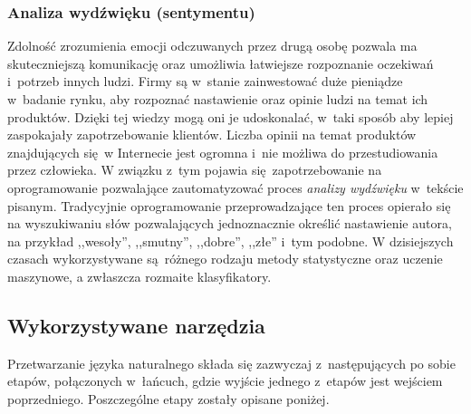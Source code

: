 \documentclass[a4paper, twoside, openright, 12pt]{report}
\begin{document}
            \subsubsection{Analiza wydźwięku (sentymentu)}
                Zdolność zrozumienia emocji odczuwanych przez drugą osobę pozwala ma skuteczniejszą komunikację oraz
                umożliwia łatwiejsze rozpoznanie oczekiwań i~potrzeb innych ludzi. Firmy są w~stanie zainwestować duże
                pieniądze w~badanie rynku, aby rozpoznać nastawienie oraz opinie ludzi na temat ich produktów. Dzięki
                tej wiedzy mogą oni je udoskonalać, w~taki sposób aby lepiej zaspokajały zapotrzebowanie klientów.
                Liczba opinii na temat produktów znajdujących się w Internecie jest ogromna i~nie możliwa do
                przestudiowania przez człowieka. W związku z~tym pojawia się zapotrzebowanie na oprogramowanie pozwalające
                zautomatyzować proces \emph{analizy wydźwięku} w~tekście pisanym. Tradycyjnie oprogramowanie
                przeprowadzające ten proces opierało się na wyszukiwaniu słów pozwalających jednoznacznie określić
                nastawienie autora, na przykład ,,wesoły'', ,,smutny'', ,,dobre'', ,,złe'' i~tym podobne. W dzisiejszych
                czasach wykorzystywane są różnego rodzaju metody statystyczne oraz uczenie maszynowe, a zwłaszcza rozmaite
                klasyfikatory\cite{SENTIMENTANALYSIS}.

        \subsection{Wykorzystywane narzędzia}
            Przetwarzanie języka naturalnego składa się zazwyczaj z~następujących po sobie etapów, połączonych w~łańcuch,
            gdzie wyjście jednego z~etapów jest wejściem poprzedniego. Poszczególne etapy zostały opisane poniżej.
\end{document}
